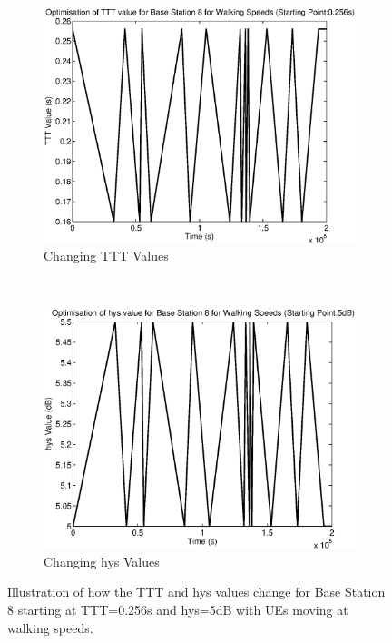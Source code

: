 \begin{figure}[H]
        \centering
        \begin{subfigure}[b]{0.49\textwidth}
                \includegraphics[width=\textwidth]{figures/graphs/walkmid/TTT8.eps}
                \caption{Changing TTT Values}
        \end{subfigure}%
        ~ %
        \begin{subfigure}[b]{0.49\textwidth}
                \includegraphics[width=\textwidth]{figures/graphs/walkmid/hys8.eps}
                \caption{Changing hys Values}
        \end{subfigure}
        \caption{Illustration of how the TTT and hys values change for Base Station 8 starting at TTT=0.256s and hys=5dB with UEs moving at walking speeds.}
\end{figure}
